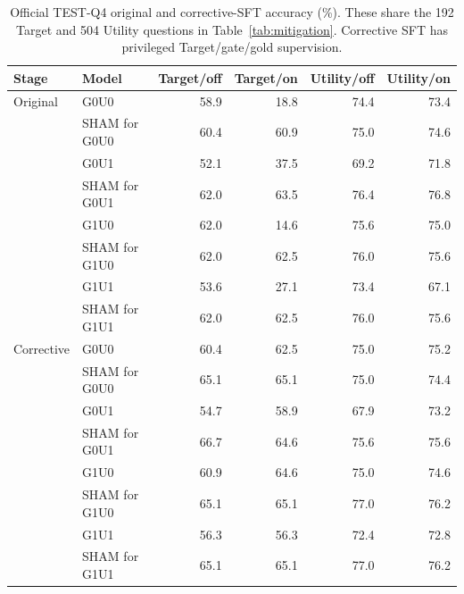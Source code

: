\documentclass{article}
\begin{document}
\begin{table}[h]
\centering
\small
\caption{Official TEST-Q4 original and corrective-SFT accuracy (\%). These share the 192 Target and 504 Utility questions in Table~\ref{tab:mitigation}. Corrective SFT has privileged Target/gate/gold supervision.}
\label{tab:q4-support}
\begin{tabular}{llrrrr}
\toprule
Stage & Model & Target/off & Target/on & Utility/off & Utility/on \\
\midrule
Original & G0U0 & 58.9 & 18.8 & 74.4 & 73.4 \\
 & SHAM for G0U0 & 60.4 & 60.9 & 75.0 & 74.6 \\
 & G0U1 & 52.1 & 37.5 & 69.2 & 71.8 \\
 & SHAM for G0U1 & 62.0 & 63.5 & 76.4 & 76.8 \\
 & G1U0 & 62.0 & 14.6 & 75.6 & 75.0 \\
 & SHAM for G1U0 & 62.0 & 62.5 & 76.0 & 75.6 \\
 & G1U1 & 53.6 & 27.1 & 73.4 & 67.1 \\
 & SHAM for G1U1 & 62.0 & 62.5 & 76.0 & 75.6 \\
\midrule
Corrective & G0U0 & 60.4 & 62.5 & 75.0 & 75.2 \\
 & SHAM for G0U0 & 65.1 & 65.1 & 75.0 & 74.4 \\
 & G0U1 & 54.7 & 58.9 & 67.9 & 73.2 \\
 & SHAM for G0U1 & 66.7 & 64.6 & 75.6 & 75.6 \\
 & G1U0 & 60.9 & 64.6 & 75.0 & 74.6 \\
 & SHAM for G1U0 & 65.1 & 65.1 & 77.0 & 76.2 \\
 & G1U1 & 56.3 & 56.3 & 72.4 & 72.8 \\
 & SHAM for G1U1 & 65.1 & 65.1 & 77.0 & 76.2 \\
\bottomrule
\end{tabular}
\end{table}
\end{document}
